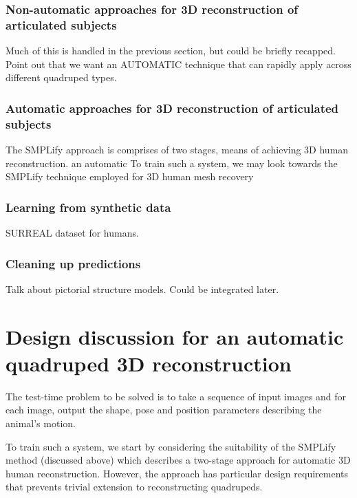 \subsubsection{Non-automatic approaches for 3D reconstruction of articulated subjects}

Much of this is handled in the previous section, but could be briefly recapped. Point out that we want an AUTOMATIC technique that can rapidly apply across different quadruped types.

\subsubsection{Automatic approaches for 3D reconstruction of articulated subjects}

The SMPLify approach is comprises of two stages, means of achieving 3D human reconstruction. an automatic To train such a system, we may look towards the SMPLify technique employed for 3D human mesh recovery


\subsubsection{Learning from synthetic data}

SURREAL dataset for humans. 

\subsubsection{Cleaning up predictions}

Talk about pictorial structure models. Could be integrated later.

\section{Design discussion for an automatic quadruped 3D reconstruction}
\def\seq#1#2#3#4{\left[{#1_{#2}}\right]_{#2=#3}^{#4}}

The test-time problem to be solved is to take a sequence of input images and for each image, output the shape, pose and position parameters describing the animal's motion.

To train such a system, we start by considering the suitability of the SMPLify~\cite{bogo16keep} method (discussed above) which describes a two-stage approach for automatic 3D human reconstruction. However, the approach has particular design requirements that prevents trivial extension to reconstructing quadrupeds. 

